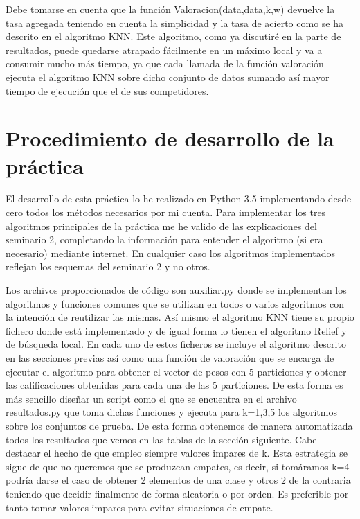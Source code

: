 \documentclass[12pt,a4paper]{article}
\begin{document}
	Debe tomarse en cuenta que la función Valoracion(data,data,k,w) devuelve la tasa agregada teniendo en cuenta la simplicidad y la tasa de acierto como se ha descrito en el algoritmo KNN.
	Este algoritmo, como ya discutiré en la parte de resultados, puede quedarse atrapado fácilmente en un máximo local y va a consumir mucho más tiempo, ya que cada llamada de la función valoración ejecuta el algoritmo KNN sobre dicho conjunto de datos sumando así mayor tiempo de ejecución que el de sus competidores.

	\newpage
	
	\section{Procedimiento de desarrollo de la práctica}
	\label{sec:procedimiento}
	
	El desarrollo de esta práctica lo he realizado en Python 3.5 implementando desde cero todos los métodos necesarios por mi cuenta. Para implementar los tres algoritmos principales de la práctica me he valido de las explicaciones del seminario 2, completando la información para entender el algoritmo (si era necesario) mediante internet. En cualquier caso los algoritmos implementados reflejan los esquemas del seminario 2 y no otros.
		
	Los archivos proporcionados de código son auxiliar.py donde se implementan los algoritmos y funciones comunes que se utilizan en todos o varios algoritmos con la intención de reutilizar las mismas. Así mismo el algoritmo KNN tiene su propio fichero donde está implementado y de igual forma lo tienen el algoritmo Relief y de búsqueda local. En cada uno de estos ficheros se incluye el algoritmo descrito en las secciones previas así como una función de valoración que se encarga de ejecutar el algoritmo para obtener el vector de pesos con 5 particiones y obtener las calificaciones obtenidas para cada una de las 5 particiones. De esta forma es más sencillo diseñar un script como el que se encuentra en el archivo resultados.py que toma dichas funciones y ejecuta para k=1,3,5 los algoritmos sobre los conjuntos de prueba. De esta forma obtenemos de manera automatizada todos los resultados que vemos en las tablas de la sección siguiente. Cabe destacar el hecho de que empleo siempre valores impares de k. Esta estrategia se sigue de que no queremos que se produzcan empates, es decir, si tomáramos k=4 podría darse el caso de obtener 2 elementos de una clase y otros 2 de la contraria teniendo que decidir finalmente de forma aleatoria o por orden. Es preferible por tanto tomar valores impares para evitar situaciones de empate.
		
\end{document}
